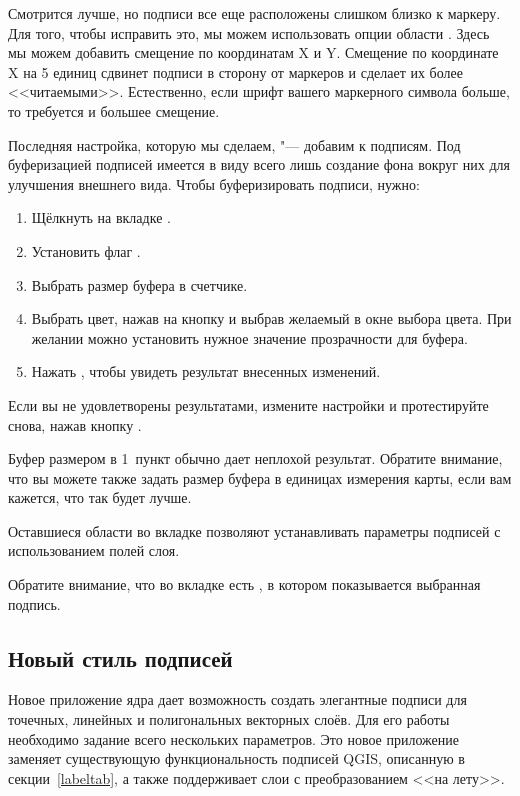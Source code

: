 Смотрится лучше, но подписи все еще расположены слишком близко к маркеру.
Для того, чтобы исправить это, мы можем использовать опции области .
Здесь мы можем добавить смещение по координатам X и Y. Смещение по координате
X на 5 единиц сдвинет подписи в сторону от маркеров и сделает их более
<<читаемыми>>. Естественно, если шрифт вашего маркерного символа больше,
то требуется и большее смещение.

Последняя настройка, которую мы сделаем, "--- добавим
 к подписям. Под буферизацией подписей имеется
в виду всего лишь создание фона вокруг них для улучшения внешнего вида.
Чтобы буферизировать подписи, нужно:

\begin{enumerate}
\item Щёлкнуть на вкладке .
\item Установить флаг .
\item Выбрать размер буфера в счетчике.
\item Выбрать цвет, нажав на кнопку  и выбрав желаемый в
окне выбора цвета. При желании можно установить нужное значение
прозрачности для буфера.
\item Нажать , чтобы увидеть результат внесенных изменений.
\end{enumerate}

Если вы не удовлетворены результатами, измените настройки и протестируйте
снова, нажав кнопку .

Буфер размером в 1~пункт обычно дает неплохой результат. Обратите внимание,
что вы можете также задать размер буфера в единицах измерения карты, если
вам кажется, что так будет лучше.

Оставшиеся области во вкладке  позволяют устанавливать
параметры подписей с использованием полей слоя.

Обратите внимание, что во вкладке  есть ,
в котором показывается выбранная подпись.

\subsection{Новый стиль подписей}\label{newlabel}

Новое приложение ядра \qg {} дает возможность
создать элегантные подписи для точечных, линейных и полигональных векторных
слоёв. Для его работы необходимо задание всего нескольких параметров.
Это новое приложение заменяет существующую функциональность подписей QGIS,
описанную в секции~\ref{labeltab}, а также поддерживает слои с преобразованием
<<на лету>>.

